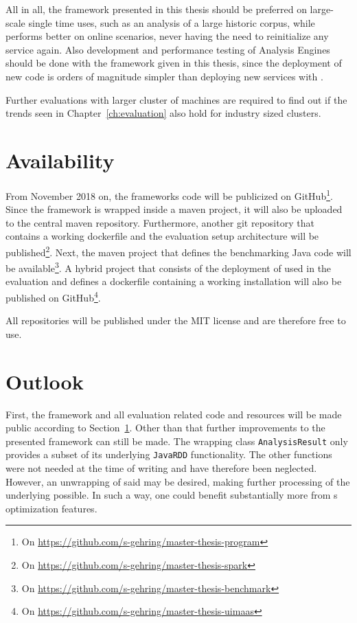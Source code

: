 All in all, the framework presented in this thesis should be preferred on large-scale single time uses, such as an analysis of a large historic corpus, while \uimaas{} performs better on online scenarios, never having the need to reinitialize any service again. Also development and performance testing of Analysis Engines should be done with the framework given in this thesis, since the deployment of new code is orders of magnitude simpler than deploying new services with \uimaas{}.

Further evaluations with larger cluster of machines are required to find out if the trends seen in Chapter~\ref{ch:evaluation} also hold for industry sized \spark{} clusters. 
\section{Availability}
\label{sec:availability}
From November 2018 on, the frameworks code will be publicized on GitHub\footnote{On \url{https://github.com/s-gehring/master-thesis-program}}. Since the framework is wrapped inside a maven project, it will also be uploaded to the central maven repository. Furthermore, another git repository that contains a working \spark{} dockerfile and the evaluation setup architecture will be published\footnote{On \url{https://github.com/s-gehring/master-thesis-spark}}. Next, the maven project that defines the benchmarking Java code will be available\footnote{On \url{https://github.com/s-gehring/master-thesis-benchmark}}. A hybrid project that consists of the deployment of \uimaas{} used in the evaluation and defines a dockerfile containing a working \uimaas{} installation will also be published on GitHub\footnote{On \url{https://github.com/s-gehring/master-thesis-uimaas}}. 

All repositories will be published under the MIT license and are therefore free to use.

\section{Outlook}
\label{sec:outlook}
First, the framework and all evaluation related code and resources will be made public according to Section~\ref{sec:availability}. Other than that further improvements to the presented framework can still be made. The wrapping class \lstinline|AnalysisResult| only provides a subset of its underlying \lstinline|JavaRDD| functionality. The other functions were not needed at the time of writing and have therefore been neglected. However, an unwrapping of said \rdd{} may be desired, making further processing of the underlying \cas{} possible. In such a way, one could benefit substantially more from \spark{}s optimization features.

